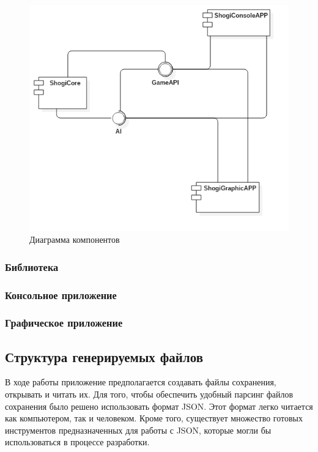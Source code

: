 \begin{figure}[H]
	\begin{center}
		\includegraphics[scale=0.7]{../diagrams/ComponentDiagram1.png}
		\caption{Диаграмма компонентов}
		\label{pic:components}
	\end{center}
\end{figure}

\subsubsection{Библиотека}

\subsubsection{Консольное приложение}

\subsubsection{Графическое приложение}

\subsection{Структура генерируемых файлов}

В ходе работы приложение предполагается создавать файлы сохранения, открывать и читать их. Для того, чтобы обеспечить удобный парсинг файлов сохранения было решено использовать формат JSON. Этот формат легко читается как компьютером, так и человеком. Кроме того, существует множество готовых инструментов предназначенных для работы с JSON, которые могли бы использоваться в процессе разработки.

